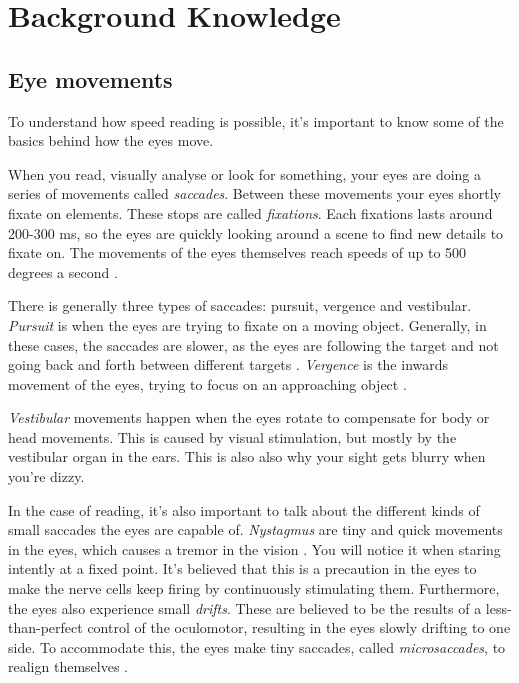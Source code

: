 \section{\fontsize{12}{15}\selectfont Background Knowledge}

\subsection{Eye movements}\label{eye}
To understand how speed reading is possible, it's important to know some of the basics behind how the eyes move.

When you read, visually analyse or look for something, your eyes are doing a series of movements called \textit{saccades}. Between these movements your eyes shortly fixate on elements. These stops are called \textit{fixations}. Each fixations lasts around 200-300 ms, so the eyes are quickly looking around a scene to find new details to fixate on. The movements of the eyes themselves reach speeds of up to 500 degrees a second \cite{eyeMovement}.

There is generally three types of saccades: pursuit, vergence and vestibular. \textit{Pursuit} is when the eyes are trying to fixate on a moving object. Generally, in these cases, the saccades are slower, as the eyes are following the target and not going back and forth between different targets \cite{eyeMovement}.
\textit{Vergence} is the inwards movement of the eyes, trying to focus on an approaching object \cite{eyeMovement}.

\textit{Vestibular} movements happen when the eyes rotate to compensate for body or head movements. This is caused by visual stimulation, but mostly by the vestibular organ in the ears. This is also also why your sight gets blurry when you're dizzy.

In the case of reading, it's also important to talk about the different kinds of small saccades the eyes are capable of. \textit{Nystagmus} are tiny and quick movements in the eyes, which causes a tremor in the vision \cite{eyeMovement}. You will notice it when staring intently at a fixed point. It's believed that this is a precaution in the eyes to make the nerve cells keep firing by continuously stimulating them. Furthermore, the eyes also experience small \textit{drifts}. These are believed to be the results of a less-than-perfect control of the oculomotor, resulting in the eyes slowly drifting to one side. To accommodate this, the eyes make tiny saccades, called \textit{microsaccades}, to realign themselves \cite{eyeMovement}.

